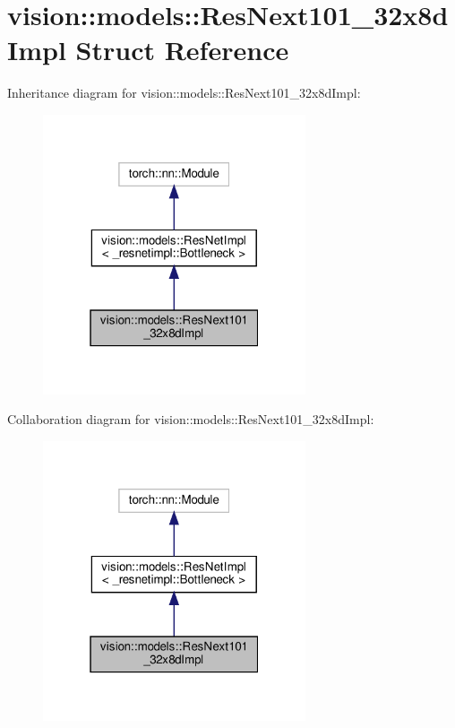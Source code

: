 \hypertarget{structvision_1_1models_1_1ResNext101__32x8dImpl}{}\section{vision\+:\+:models\+:\+:Res\+Next101\+\_\+32x8d\+Impl Struct Reference}
\label{structvision_1_1models_1_1ResNext101__32x8dImpl}


Inheritance diagram for vision\+:\+:models\+:\+:Res\+Next101\+\_\+32x8d\+Impl\+:
\nopagebreak
\begin{figure}[H]
\begin{center}
\leavevmode
\includegraphics[width=220pt]{structvision_1_1models_1_1ResNext101__32x8dImpl__inherit__graph}
\end{center}
\end{figure}


Collaboration diagram for vision\+:\+:models\+:\+:Res\+Next101\+\_\+32x8d\+Impl\+:
\nopagebreak
\begin{figure}[H]
\begin{center}
\leavevmode
\includegraphics[width=220pt]{structvision_1_1models_1_1ResNext101__32x8dImpl__coll__graph}
\end{center}
\end{figure}
